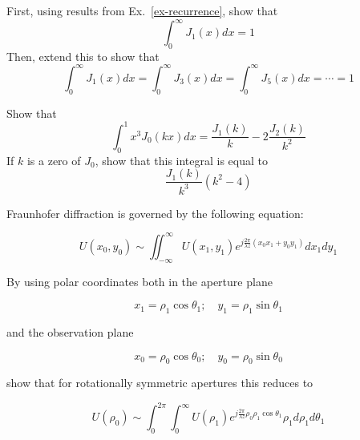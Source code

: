 \begin{exer}
First, using results from Ex.~\ref{ex-recurrence}, show that
$$\int_0^\infty J_1( x) dx =  1$$
Then, extend this to show that
$$\int_0^\infty J_1( x) dx = \int_0^\infty J_3( x) dx = \int_0^\infty J_5( x) dx = \cdots = 1$$
\end{exer}

\begin{exer}
Show that
$$\int_0^1 x^3 J_0(k x) dx =  \frac{J_1(k)}{k} - 2 \frac{J_2(k)}{k^2}$$
If $k$ is a zero of $J_0$, show that this integral is equal to
$$\frac{J_1(k)}{k^3}\left(k^2-4\right)$$
\end{exer}

\pagebreak 

\begin{exer}
Fraunhofer diffraction is governed by the following equation:

$$U(x_0, y_0) \sim \iint_{-\infty}^{\infty} U(x_1, y_1) e ^{j \frac{2\pi}{\lambda z} (x_0 x_1 + y_0 y_1)} dx_1 dy_1  $$

By using polar coordinates both in the aperture plane

$$x_1 = \rho_1 \cos \theta_1; \quad y_1 = \rho_1 \sin \theta_1$$

and the observation plane

$$x_0 = \rho_0 \cos \theta_0; \quad y_0 = \rho_0 \sin \theta_0$$

show that for rotationally symmetric apertures this reduces to

$$U(\rho_0) \sim \int_0^{2 \pi} \int_0^{\infty} U(\rho_1)  e ^{j \frac{2\pi}{\lambda z} \rho_0 \rho_1 \cos \theta_1} \rho_1 d\rho_1 d\theta_1  $$


\end{exer}
